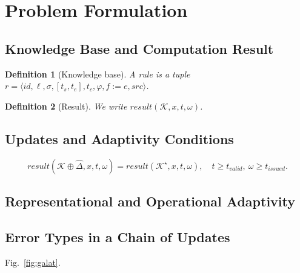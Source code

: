 \documentclass{ieeeaccess}
\newtheorem{definition}{Definition}
\begin{document}
\lipsum[108] %

\section{Problem Formulation}
\lipsum[29][1-3]
\lipsum[109] %

\subsection{Knowledge Base and Computation Result}
\begin{definition}[Knowledge base]
\lipsum[30][1-3] A rule is a tuple $r = \langle \mathit{id}, \ell, \sigma, [t_s, t_e], t_c, \varphi, f \mathrel{:=} e, \mathit{src} \rangle$.
\end{definition}
\begin{definition}[Result]
\lipsum[31][1-2] We write $\mathit{result}(\mathcal{K}, x, t, \omega)$.
\end{definition}
\lipsum[32][1-4]

\lipsum[110] %

\subsection{Updates and Adaptivity Conditions}
\lipsum[33][1-3]
\begin{equation}
\mathit{result}(\mathcal{K}\oplus\hat{\Delta}, x, t, \omega) = \mathit{result}(\mathcal{K}^\star, x, t, \omega), \quad t \ge t_{\mathit{valid}},\ \omega \ge t_{\mathit{issued}}.
\end{equation}
\lipsum[34][1-5]

\lipsum[111] %

\subsection{Representational and Operational Adaptivity}
\lipsum[35][1-6]

\lipsum[112] %

\subsection{Error Types in a Chain of Updates}
\lipsum[36][1-6] Fig.~\ref{fig:galat}.
\end{document}
